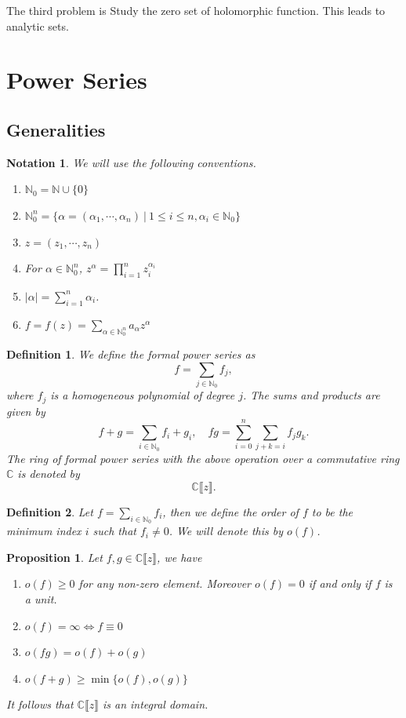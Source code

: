 \documentclass{article}
\newtheorem{proposition}{Proposition}[section]
\newtheorem{definition}{Definition}[section]
\newtheorem{notation}{Notation}[section]
\newcommand{\N}[0]{\mathbb{N}}
\newcommand{\C}[0]{\mathbb{C}}
\newcommand{\sep}[0]{\:|\:}
\newcommand{\order}[0]{o}
\begin{document}
The third problem is 
Study the zero set of holomorphic function. This leads to analytic sets.

\section{Power Series}

\subsection{Generalities}
\begin{notation}
  We will use the following conventions.
  \begin{enumerate}[1).]
    \item $\N_0 = \N\cup\{0\}$
    \item $\N_0^n = \{\alpha = (\alpha_1,\cdots,\alpha_n)\sep 1\leq i\leq n,\alpha_i \in\N_0\}$
    \item $z = (z_1,\cdots,z_n)$
    \item For $\alpha\in \N_0^n$, $z^\alpha = \prod_{i=1}^n z_i^{\alpha_i}$
    \item $\vert\alpha\vert = \sum_{i=1}^n\alpha_i$.
    \item $f = f(z) = \sum_{\alpha\in\N_0^n}a_\alpha z^\alpha$
  \end{enumerate}
\end{notation}
\begin{definition}
  We define the formal power series as 
  \begin{equation*}
    f = \sum_{j\in\N_0}f_j,
  \end{equation*}
  where $f_j$ is a homogeneous polynomial of degree $j$. The sums and products are given by 
  \begin{equation*}
    f+g = \sum_{i\in\N_0}f_i+g_i,\quad fg = \sum_{i=0}^n \sum_{j+k=i}f_jg_k.
  \end{equation*}
  The ring of formal power series with the above operation over a commutative ring $\C$ is denoted by 
  \begin{equation*}
    \C\llbracket z\rrbracket.
  \end{equation*}
\end{definition}
\begin{definition}
  Let $f=\sum_{i\in\N_0}f_i$, then we define the order of $f$ to be the minimum index $i$ such that $f_i \not = 0$.
  We will denote this by $\order(f)$.
\end{definition}
\begin{proposition}
  Let $f,g\in\C\llbracket z\rrbracket$, we have 
  \begin{enumerate}[1).]
    \item $\order(f)\geq 0$ for any non-zero element. Moreover $\order(f) = 0$ if and only if $f$ is a unit.
    \item $\order(f) = \infty \Leftrightarrow f\equiv 0$
    \item $\order(fg) = \order(f)+\order(g)$
    \item $\order(f+g) \geq \min\{ \order(f),\order(g)\}$
  \end{enumerate}
  It follows that $\C\llbracket z \rrbracket$ is an integral domain.
\end{proposition}
\end{document}
